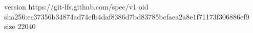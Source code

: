 version https://git-lfs.github.com/spec/v1
oid sha256:ec37356b34874ad74efb4daf8386d7bd83785bcfaea2a8e1f71173f306886ef9
size 22040
